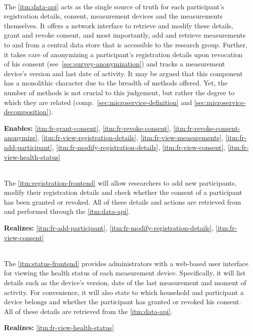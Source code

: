 \begin{description}[format={\storedescriptionlabel}]
  \item[Data \acs*{API}\label{itm:data-api}]
  \hfill \\
  The \ref{itm:data-api} acts as the single source of truth for each participant's registration details, consent, measurement devices and the measurements themselves. It offers a network interface to retrieve and modify these details, grant and revoke consent, and most importantly, add and retrieve measurements to and from a central data store that is accessible to the research group. Further, it takes care of anonymizing a participant's registration details upon revocation of his consent (see~\autoref{sec:survey-anonymization}) and tracks a measurement device's version and last date of activity. It may be argued that this component has a monolithic character due to the breadth of methods offered. Yet, the number of methods is not crucial to this judgement, but rather the degree to which they are related (comp.~\autoref{sec:microservice-definition} and \autoref{sec:microservice-decomposition}).

  \textbf{Enables:} \ref{itm:fr-grant-consent}, \ref{itm:fr-revoke-consent}, \ref{itm:fr-revoke-consent-anonymize}, \ref{itm:fr-view-registration-details}, \ref{itm:fr-view-measurements}, \ref{itm:fr-add-participant}, \ref{itm:fr-modify-registration-details}, \ref{itm:fr-view-consent}, \ref{itm:fr-view-health-status}

  \item[Registration Frontend\label{itm:registration-frontend}]
  \hfill \\
  The \ref{itm:registration-frontend} will allow researchers to add new participants, modify their registration details and check whether the consent of a participant has been granted or revoked. All of these details and actions are retrieved from and performed through the \ref{itm:data-api}.

  \textbf{Realizes:} \ref{itm:fr-add-participant}, \ref{itm:fr-modify-registration-details}, \ref{itm:fr-view-consent}

  \item[Status Frontend\label{itm:status-frontend}]
  \hfill \\
  The \ref{itm:status-frontend} provides administrators with a web-based user interface for viewing the health status of each measurement device. Specifically, it will list details such as the device's version, date of the last measurement and moment of activity. For convenience, it will also state to which household and participant a device belongs and whether the participant has granted or revoked his consent. All of these details are retrieved from the \ref{itm:data-api}.

  \textbf{Realizes:} \ref{itm:fr-view-health-status}
\end{description}


